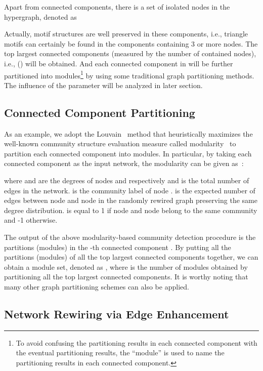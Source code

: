 \documentclass[sigconf]{acmart}
\begin{document}
Apart from  connected components, there is a set of isolated nodes in the hypergraph, denoted as

Actually, motif structures are well preserved in these components, i.e., triangle motifs can certainly be found in the components containing 3 or more nodes.
The top  largest connected components (measured by the number of contained nodes), i.e.,
 () will be obtained. And each connected component in  will be further partitioned into modules\footnote{To avoid confusing the partitioning results in each connected component with the eventual partitioning results, the ``module'' is used to name the partitioning results in each connected component.} by using some traditional graph partitioning methods.
The influence of the parameter  will be analyzed in later section.

\subsection{Connected Component Partitioning}
As an example, we adopt the Louvain~\cite{Vincent2008Fast} method that heuristically maximizes the well-known community structure evaluation measure called modularity~\cite{newman2006modularity,newman2004finding} to partition each connected component  into modules. In particular, by taking each connected component  as the input network, the modularity  can be given as~\cite{newman2006modularity}:

where  and  are the degrees of nodes  and  respectively and  is the total number of edges in the network.  is the community label of node .  is the expected number of edges between node  and node  in the randomly rewired graph preserving the same degree distribution.  is equal to 1 if node  and node  belong to the same community and -1 otherwise. 



The output of the above modularity-based community detection procedure is the partitions (modules) in the -th connected component . By putting all the partitions (modules) of all the top  largest connected components together, we can obtain a module set, denoted as , where  is the number of modules obtained by partitioning all the top  largest connected components.
It is worthy noting that many other graph partitioning schemes can also be applied. 

\subsection{Network Rewiring via Edge Enhancement}
\end{document}
